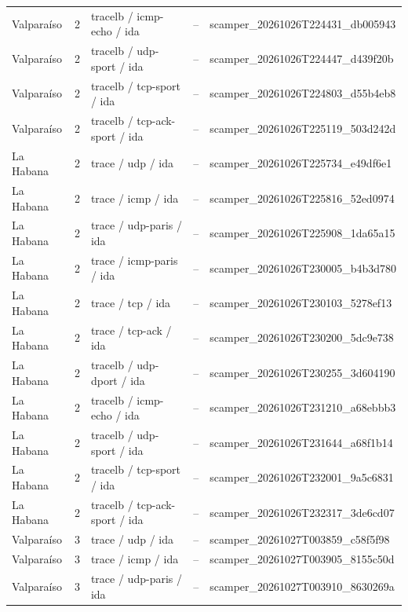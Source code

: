 \begin{longtable}{p{2cm}p{1.15cm}p{4.2cm}p{2.2cm}p{4.95cm}}
Valparaíso & 2 & tracelb / icmp-echo / ida & -- & scamper\_\allowbreak{}20261026T224431\_\allowbreak{}db005943 \\
Valparaíso & 2 & tracelb / udp-sport / ida & -- & scamper\_\allowbreak{}20261026T224447\_\allowbreak{}d439f20b \\
Valparaíso & 2 & tracelb / tcp-sport / ida & -- & scamper\_\allowbreak{}20261026T224803\_\allowbreak{}d55b4eb8 \\
Valparaíso & 2 & tracelb / tcp-ack-sport / ida & -- & scamper\_\allowbreak{}20261026T225119\_\allowbreak{}503d242d \\
La Habana & 2 & trace / udp / ida & -- & scamper\_\allowbreak{}20261026T225734\_\allowbreak{}e49df6e1 \\
La Habana & 2 & trace / icmp / ida & -- & scamper\_\allowbreak{}20261026T225816\_\allowbreak{}52ed0974 \\
La Habana & 2 & trace / udp-paris / ida & -- & scamper\_\allowbreak{}20261026T225908\_\allowbreak{}1da65a15 \\
La Habana & 2 & trace / icmp-paris / ida & -- & scamper\_\allowbreak{}20261026T230005\_\allowbreak{}b4b3d780 \\
La Habana & 2 & trace / tcp / ida & -- & scamper\_\allowbreak{}20261026T230103\_\allowbreak{}5278ef13 \\
La Habana & 2 & trace / tcp-ack / ida & -- & scamper\_\allowbreak{}20261026T230200\_\allowbreak{}5dc9e738 \\
La Habana & 2 & tracelb / udp-dport / ida & -- & scamper\_\allowbreak{}20261026T230255\_\allowbreak{}3d604190 \\
La Habana & 2 & tracelb / icmp-echo / ida & -- & scamper\_\allowbreak{}20261026T231210\_\allowbreak{}a68ebbb3 \\
La Habana & 2 & tracelb / udp-sport / ida & -- & scamper\_\allowbreak{}20261026T231644\_\allowbreak{}a68f1b14 \\
La Habana & 2 & tracelb / tcp-sport / ida & -- & scamper\_\allowbreak{}20261026T232001\_\allowbreak{}9a5c6831 \\
La Habana & 2 & tracelb / tcp-ack-sport / ida & -- & scamper\_\allowbreak{}20261026T232317\_\allowbreak{}3de6cd07 \\
Valparaíso & 3 & trace / udp / ida & -- & scamper\_\allowbreak{}20261027T003859\_\allowbreak{}c58f5f98 \\
Valparaíso & 3 & trace / icmp / ida & -- & scamper\_\allowbreak{}20261027T003905\_\allowbreak{}8155c50d \\
Valparaíso & 3 & trace / udp-paris / ida & -- & scamper\_\allowbreak{}20261027T003910\_\allowbreak{}8630269a \\

\end{longtable}
